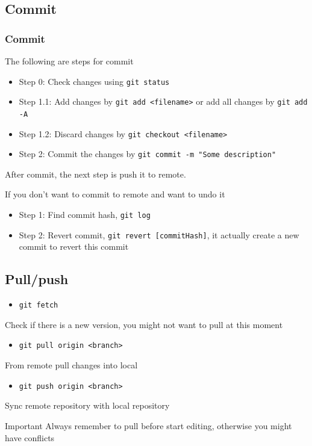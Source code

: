 \documentclass{beamer}
\begin{document}
		\subsection{Commit}
			\begin{frame}
				\frametitle{Commit}
				The following are steps for commit
				\begin{itemize}
					\item Step 0: Check changes using \texttt{git status}
					\item Step 1.1: Add changes by \texttt{git add <filename>} or add all changes by \texttt{git add -A}
					\item Step 1.2: Discard changes by \texttt{git checkout <filename>}
					\item Step 2: Commit the changes by \texttt{git commit -m "Some description"}
				\end{itemize}
				After commit, the next step is push it to remote.

				If you don't want to commit to remote and want to undo it
				\begin{itemize}
					\item Step 1: Find commit hash, \texttt{git log}
					\item Step 2: Revert commit, \texttt{git revert [commitHash]}, it actually create a new commit to revert this commit
				\end{itemize}
			\end{frame}

		\subsection{Pull/push}
			\begin{frame}
				\begin{itemize}
					\item \texttt{git fetch}
				\end{itemize}
				Check if there is a new version, you might not want to pull at this moment

				\begin{itemize}
					\item \texttt{git pull origin <branch>}
				\end{itemize}
				From remote pull changes into local

				\begin{itemize}
					\item \texttt{git push origin <branch>}
				\end{itemize}
				Sync remote repository with local repository

				\begin{alertblock}{Important}
					Always remember to pull before start editing, otherwise you might have conflicts
				\end{alertblock}
			\end{frame}
\end{document}
